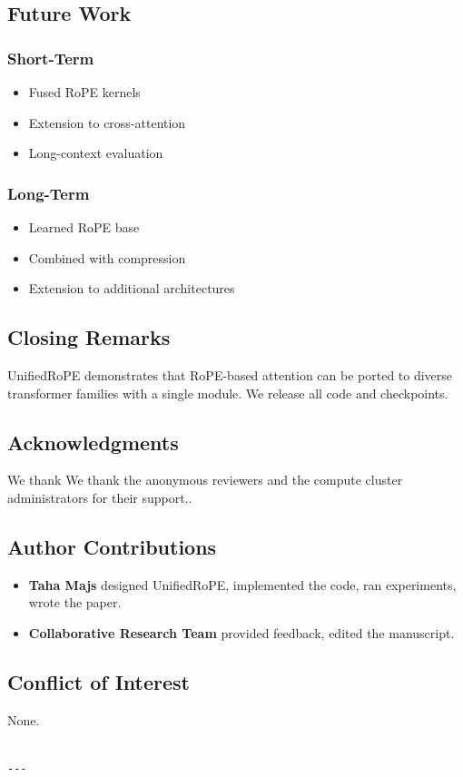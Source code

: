 \subsection{Future Work}

\subsubsection{Short-Term}
\begin{itemize}
\item Fused RoPE kernels
\item Extension to cross-attention
\item Long-context evaluation

\end{itemize}
\subsubsection{Long-Term}
\begin{itemize}
\item Learned RoPE base
\item Combined with compression
\item Extension to additional architectures

\end{itemize}
\subsection{Closing Remarks}

UnifiedRoPE demonstrates that RoPE-based attention can be ported to diverse 
transformer families with a single module. We release all code and 
checkpoints.

\subsection{Acknowledgments}

We thank We thank the anonymous reviewers and the compute cluster administrators for their support..

\subsection{Author Contributions}

\begin{itemize}
\item \textbf{Taha Majs} designed UnifiedRoPE, implemented the code, ran
  experiments, wrote the paper.
\item \textbf{Collaborative Research Team} provided feedback, edited the manuscript.

\end{itemize}
\subsection{Conflict of Interest}

None.
\begin{lstlisting}

---
\end{lstlisting}